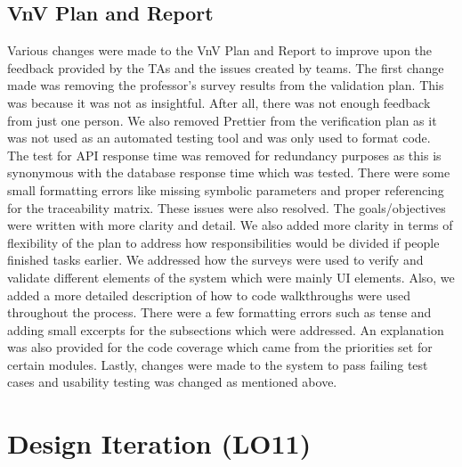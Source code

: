 \documentclass{article}
\begin{document}
\subsection{VnV Plan and Report}
Various changes were made to the VnV Plan and Report to improve upon the feedback provided by the TAs and the issues created by teams. The first change made was removing the professor's survey results from the validation plan. This was because it was not as insightful. After all, there was not enough feedback from just one person. We also removed Prettier from the verification plan as it was not used as an automated testing tool and was only used to format code. The test for API response time was removed for redundancy purposes as this is synonymous with the database response time which was tested. There were some small formatting errors like missing symbolic parameters and proper referencing for the traceability matrix. These issues were also resolved. The goals/objectives were written with more clarity and detail. We also added more clarity in terms of flexibility of the plan to address how responsibilities would be divided if people finished tasks earlier. We addressed how the surveys were used to verify and validate different elements of the system which were mainly UI elements. Also, we added a more detailed description of how to code walkthroughs were used throughout the process. There were a few formatting errors such as tense and adding small excerpts for the subsections which were addressed. An explanation was also provided for the code coverage which came from the priorities set for certain modules. Lastly, changes were made to the system to pass failing test cases and usability testing was changed as mentioned above.

\section{Design Iteration (LO11)}
\end{document}
